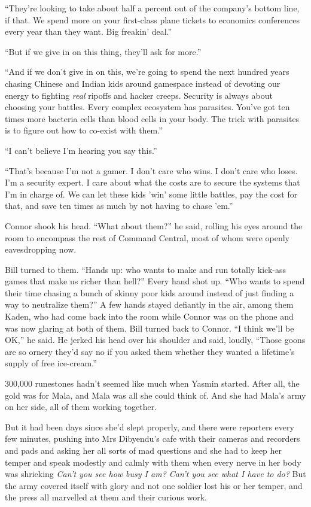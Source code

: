 ``They're looking to take about half a percent out of the company's
bottom line, if that. We spend more on your first-class plane
tickets to economics conferences every year than they want. Big
freakin' deal.''

``But if we give in on this thing, they'll ask for more.''

``And if we don't give in on this, we're going to spend the next
hundred years chasing Chinese and Indian kids around gamespace
instead of devoting our energy to fighting \emph{real} ripoffs and
hacker creeps. Security is always about choosing your battles.
Every complex ecosystem has parasites. You've got ten times more
bacteria cells than blood cells in your body. The trick with
parasites is to figure out how to co-exist with them.''

``I can't believe I'm hearing you say this.''

``That's because I'm not a gamer. I don't care who wins. I don't
care who loses. I'm a security expert. I care about what the costs
are to secure the systems that I'm in charge of. We can let these
kids 'win' some little battles, pay the cost for that, and save ten
times as much by not having to chase 'em.''

Connor shook his head. ``What about them?'' he said, rolling his eyes
around the room to encompass the rest of Command Central, most of
whom were openly eavesdropping now.

Bill turned to them. ``Hands up: who wants to make and run totally
kick-ass games that make us richer than hell?'' Every hand shot up.
``Who wants to spend their time chasing a bunch of skinny poor kids
around instead of just finding a way to neutralize them?'' A few
hands stayed defiantly in the air, among them Kaden, who had come
back into the room while Connor was on the phone and was now
glaring at both of them. Bill turned back to Connor. ``I think we'll
be OK,'' he said. He jerked his head over his shoulder and said,
loudly, ``Those goons are so ornery they'd say no if you asked them
whether they wanted a lifetime's supply of free ice-cream.''

\tb

300,000 runestones hadn't seemed like much when Yasmin started.
After all, the gold was for Mala, and Mala was all she could think
of. And she had Mala's army on her side, all of them working
together.

But it had been days since she'd slept properly, and there were
reporters every few minutes, pushing into Mrs Dibyendu's cafe with
their cameras and recorders and pads and asking her all sorts of
mad questions and she had to keep her temper and speak modestly and
calmly with them when every nerve in her body was shrieking
\emph{Can't you see how busy I am? Can't you see what I have to do?}
But the army covered itself with glory and not one soldier lost his
or her temper, and the press all marvelled at them and their
curious work.

